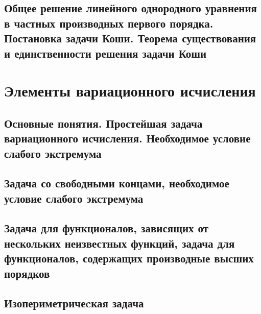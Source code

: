 \subsection{Общее решение линейного однородного уравнения в частных производных первого порядка. Постановка задачи Коши. Теорема существования и единственности решения задачи Коши}

\newpage

\section{Элементы вариационного исчисления}

\subsection{Основные понятия. Простейшая задача вариационного исчисления. Необходимое условие слабого экстремума}

\newpage

\subsection{Задача со свободными концами, необходимое условие слабого экстремума}

\newpage

\subsection{Задача для функционалов, зависящих от нескольких неизвестных функций, задача для функционалов, содержащих производные высших порядков}

\newpage

\subsection{Изопериметричеcкая задача}

